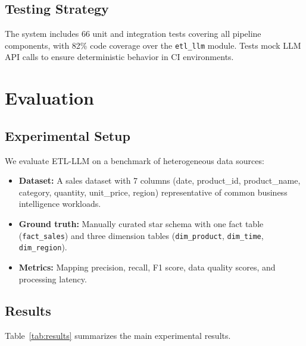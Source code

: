 \documentclass[conference]{IEEEtran}
\begin{document}
\subsection{Testing Strategy}

The system includes 66 unit and integration tests covering all pipeline
components, with 82\% code coverage over the \texttt{etl\_llm} module.
Tests mock LLM API calls to ensure deterministic behavior in CI environments.

\section{Evaluation}
\label{sec:evaluation}

\subsection{Experimental Setup}

We evaluate \textsc{ETL-LLM} on a benchmark of heterogeneous data sources:

\begin{itemize}
  \item \textbf{Dataset:} A sales dataset with 7 columns (date, product\_id,
    product\_name, category, quantity, unit\_price, region) representative of
    common business intelligence workloads.
  \item \textbf{Ground truth:} Manually curated star schema with one fact table
    (\texttt{fact\_sales}) and three dimension tables (\texttt{dim\_product},
    \texttt{dim\_time}, \texttt{dim\_region}).
  \item \textbf{Metrics:} Mapping precision, recall, F1 score, data quality
    scores, and processing latency.
\end{itemize}

\subsection{Results}

Table~\ref{tab:results} summarizes the main experimental results.
\end{document}
